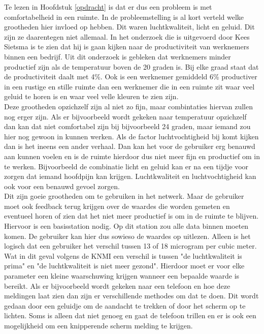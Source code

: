
Te lezen in Hoofdstuk \ref{opdracht} is dat er dus een probleem is met comfortabelheid in een ruimte. In de probleemstelling is al 
kort verteld welke grootheden hier invloed op hebben. Dit waren luchtkwaliteit, licht en geluid. Dit zijn ze daarentegen niet allemaal. 
In het onderzoek die is uitgevoerd door Kees Sietsma \cite{productiviteit} is te zien dat hij is gaan kijken naar de 
productiviteit van werknemers binnen een bedrijf. Uit dit onderzoek is gebleken dat werknemers minder productief zijn als de temperatuur
boven de 20 graden is. Bij elke graad staat dat de productiviteit daalt met 4\%. Ook is een werknemer gemiddeld 6\% productiver in een rustige
en stille ruimte dan een werknemer die in een ruimte zit waar veel geluid te horen is en waar veel velle kleuren te zien zijn. \\

Deze grootheden opzichzelf zijn al niet zo fijn, maar combintaties hiervan zullen nog erger zijn. Als er bijvoorbeeld wordt gekeken naar
temperatuur opzichzelf dan kan dat niet comfortabel zijn bij bijvoorbeeld 24 graden, maar iemand zou hier nog gewoon in kunnen werken. 
Als de factor luchtvochtigheid bij komt kijken dan is het ineens een ander verhaal. Dan kan het voor de gebruiker erg benauwd aan kunnen
voelen en is de ruimte hierdoor dus niet meer fijn en productief om in te werken. Bijvoorbeeld de combinatie licht en geluid kan er na 
een tijdje voor zorgen dat iemand hoofdpijn kan krijgen. Luchtkwaliteit en luchtvochtigheid kan ook voor een benauwd gevoel zorgen. \\

Dit zijn goeie grootheden om te gebruiken in het netwerk. Maar de gebruiker moet ook feedback terug krijgen over de waardes die worden
gemeten en eventueel horen of zien dat het niet meer productief is om in de ruimte te blijven. Hiervoor is een basisstation nodig. 
Op dit station zou alle data binnen moeten komen. De gebruiker kan hier dus sowieso de waardes op uitlezen. Alleen is het logisch dat
een gebruiker het verschil tussen 13 of 18 microgram per cubic meter. Wat in dit geval volgens de KNMI \cite{Gezonde} een verschil is tussen
"de luchtkwaliteit is prima" en "de luchtkwaliteit is niet meer gezond". Hierdoor moet er voor elke parameter een kleine waarschuwing krijgen
wanneer een bepaalde waarde is bereikt. Als er bijvoorbeeld wordt gekeken naar een telefoon en hoe deze meldingen laat zien dan zijn er 
verschillende methodes om dat te doen. Dit wordt gedaan door een geluidje om de aandacht te trekken of door het scherm op te lichten. Soms
is alleen dat niet genoeg en gaat de telefoon trillen en er is ook een mogelijkheid om een knipperende scherm melding te krijgen.





